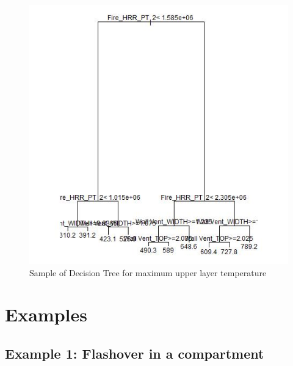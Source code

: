 \documentclass[12pt,twoside]{book}
\begin{document}
\begin{figure}[h!]
\centering
\includegraphics[width=6.5in]{FIGURES/simple_tree_temp.jpeg}
\caption{Sample of Decision Tree for maximum upper layer temperature}
\label{simple_tree_temp}
\end{figure}

%
%

\chapter{Examples}

%
%

\section{Example 1: Flashover in a compartment}
\end{document}
